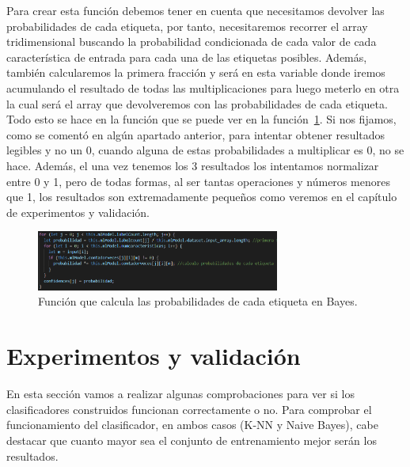 \documentclass[a4paper, 12pt]{book}
\begin{document}
Para crear esta función debemos tener en cuenta que necesitamos devolver las probabilidades de cada etiqueta, por tanto, necesitaremos recorrer el array tridimensional buscando la probabilidad condicionada de cada valor de cada característica de entrada para cada una de las etiquetas posibles. Además, también calcularemos la primera fracción y será en esta variable donde iremos acumulando el resultado de todas las multiplicaciones para luego meterlo en otra la cual será el array que devolveremos con las probabilidades de cada etiqueta. Todo esto se hace en la función que se puede ver en la función~\ref{fig:probabilidadesetiquetasbayes}. Si nos fijamos, como se comentó en algún apartado anterior, para intentar obtener resultados legibles y no un 0, cuando alguna de estas probabilidades a multiplicar es 0, no se hace. Además, el una vez tenemos los 3 resultados los intentamos normalizar entre 0 y 1, pero de todas formas, al ser tantas operaciones y números menores que 1, los resultados son extremadamente pequeños como veremos en el capítulo de experimentos y validación.

\begin{figure}
	\centering
	\includegraphics[width=8cm, keepaspectratio]{img/probabilidadesetiquetasbayes}
	\caption{Función que calcula las probabilidades de cada etiqueta en Bayes.}			
	\label{fig:probabilidadesetiquetasbayes}
\end{figure}




\cleardoublepage
\chapter{Experimentos y validación}

En esta sección vamos a realizar algunas comprobaciones para ver si los clasificadores construidos funcionan correctamente o no. Para comprobar el funcionamiento del clasificador, en ambos casos (K-NN y Naive Bayes), cabe destacar que cuanto mayor sea el conjunto de entrenamiento mejor serán los resultados.
\end{document}
